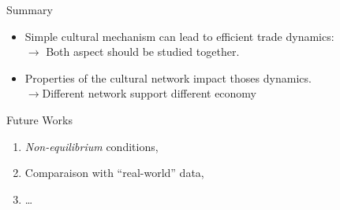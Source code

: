 \documentclass[12pt, notes=show]{beamer}
\begin{document}
	\begin{frame}{Summary}
		\begin{itemize}
			\item Simple cultural mechanism can lead to efficient trade dynamics:\\
				{$\rightarrow$ \small Both aspect should be studied together.}
				\vfill
			\item Properties of the cultural network impact thoses dynamics.\\
				{$\rightarrow$\small Different network support different economy}
				\vfill
		\end{itemize}

	\end{frame}
	\begin{frame}{Future Works}
		
		\begin{enumerate}
			\item \emph{Non-equilibrium} conditions,
			\item Comparaison with ``real-world'' data,
			\item \dots
		\end{enumerate}
	\end{frame}
\end{document}
